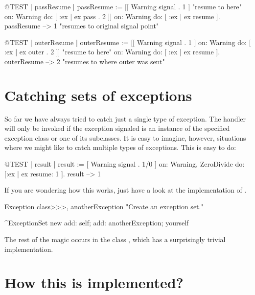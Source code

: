 \documentclass[a4paper,10pt,twoside]{book}
\begin{document}
\begin{code}{@TEST | passResume |}
passResume := [[ Warning signal . 1 ]    "resume to here"
	on: Warning
	do: [ :ex | ex pass . 2 ]]
		on: Warning
		do: [ :ex | ex resume ].
passResume --> 1    "resumes to original signal point"
\end{code}


\begin{code}{@TEST | outerResume |}
outerResume := [[ Warning signal . 1 ]
	on: Warning
	do: [ :ex | ex outer . 2 ]]    "resume to here"
		on: Warning
		do: [ :ex | ex resume ].
outerResume --> 2    "resumes to where outer was sent"
\end{code}

\section{Catching sets of exceptions}

So far we have always tried to catch just a single type of exception. The handler will only be invoked if the exception signaled is an instance of the specified exception class or one of its subclasses. It is easy to imagine, however, situations where we might like to catch multiple types of exceptions. This is easy to do:

\begin{code}{@TEST | result |}
result := [ Warning signal . 1/0 ]
	on: Warning, ZeroDivide
	do: [:ex | ex resume: 1 ].
result --> 1
\end{code}

If you are wondering how this works, just have a look at the implementation of .

\begin{code}{}
Exception class>>>, anotherException
	"Create an exception set."

	^ExceptionSet new
		add: self;
		add: anotherException;
		yourself
\end{code}

The rest of the magic occurs in the class , which has a surprisingly trivial implementation.


\section{How this is implemented?}

\end{document}
